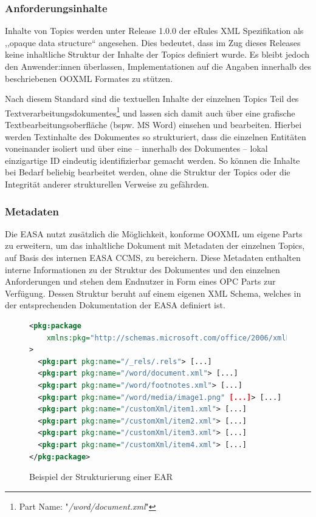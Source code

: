 \subsubsection{Anforderungsinhalte}

    Inhalte von Topics werden unter Release 1.0.0 der eRules \ac{XML} Spezifikation als ,,opaque data structure`` angesehen.
    Dies bedeutet, dass im Zug dieses Releases keine inhaltliche Struktur der Inhalte der Topics definiert wurde.
    Es bleibt jedoch den Anwender:innen überlassen, Implementationen auf die Angaben innerhalb des beschriebenen \acs{OOXML} Formates zu stützen.
    \cite[6]{easa_xml_doc}

    Nach diesem Standard sind die textuellen Inhalte der einzelnen Topics Teil des Textverarbeitungsdokumentes\footnote{Part Name: "\textit{/word/document.xml}"} und lassen sich damit auch über eine grafische Textbearbeitungsoberfläche (bspw. \ac{MS} Word) einsehen und bearbeiten.
    Hierbei werden Textinhalte des Dokumentes so strukturiert, dass die einzelnen Entitäten voneinander isoliert und über eine -- innerhalb des Dokumentes -- lokal einzigartige ID eindeutig identifizierbar gemacht werden.
    So können die Inhalte bei Bedarf beliebig bearbeitet werden, ohne die Struktur der Topics oder die Integrität anderer strukturellen Verweise zu gefährden.

\subsubsection{Metadaten}

    Die \ac{EASA} nutzt zusätzlich die Möglichkeit, konforme \ac{OOXML} um eigene Parts zu erweitern, um das inhaltliche Dokument mit Metadaten der einzelnen Topics, auf Basis des internen \ac{EASA} \ac{CCMS}, zu bereichern.
    Diese Metadaten enthalten interne Informationen zu der Struktur des Dokumentes und den einzelnen Anforderungen und stehen dem Endnutzer in Form eines \ac{OPC} Parts  zur Verfügung.
    Dessen Struktur beruht auf einem eigenen \ac{XML} Schema, welches in der entsprechenden Dokumentation der \ac{EASA} definiert ist.


\begin{figure}[H]
    \centering
    \begin{lstlisting}[language=XML]
<pkg:package 
    xmlns:pkg="http://schemas.microsoft.com/office/2006/xmlPackage"
>
  <pkg:part pkg:name="/_rels/.rels"> [...]
  <pkg:part pkg:name="/word/document.xml"> [...]
  <pkg:part pkg:name="/word/footnotes.xml"> [...]
  <pkg:part pkg:name="/word/media/image1.png" [...]> [...]
  <pkg:part pkg:name="/customXml/item1.xml"> [...]
  <pkg:part pkg:name="/customXml/item2.xml"> [...]
  <pkg:part pkg:name="/customXml/item3.xml"> [...]
  <pkg:part pkg:name="/customXml/item4.xml"> [...]
</pkg:package>
    \end{lstlisting}
    \caption{Beispiel der  Strukturierung einer \ac{EAR}}
    \label{fig:opcear}
\end{figure}


